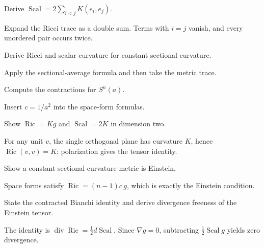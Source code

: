 \begin{problem}\label{prob:vii27-04}
Derive \(\operatorname{Scal}=2\sum_{i<j}K(e_i,e_j)\).
\end{problem}
\begin{solution}
Expand the Ricci trace as a double sum. Terms with \(i=j\) vanish, and every unordered pair occurs twice.
\end{solution}

\begin{problem}\label{prob:vii27-05}
Derive Ricci and scalar curvature for constant sectional curvature.
\end{problem}
\begin{solution}
Apply the sectional-average formula and then take the metric trace.
\end{solution}

\begin{problem}\label{prob:vii27-06}
Compute the contractions for \(S^n(a)\).
\end{problem}
\begin{solution}
Insert \(c=1/a^2\) into the space-form formulas.
\end{solution}

\begin{problem}\label{prob:vii27-07}
Show \(\operatorname{Ric}=Kg\) and \(\operatorname{Scal}=2K\) in dimension two.
\end{problem}
\begin{solution}
For any unit \(v\), the single orthogonal plane has curvature \(K\), hence \(\operatorname{Ric}(v,v)=K\); polarization gives the tensor identity.
\end{solution}

\begin{problem}\label{prob:vii27-08}
Show a constant-sectional-curvature metric is Einstein.
\end{problem}
\begin{solution}
Space forms satisfy \(\operatorname{Ric}=(n-1)c\,g\), which is exactly the Einstein condition.
\end{solution}

\begin{problem}\label{prob:vii27-09}
State the contracted Bianchi identity and derive divergence freeness of the Einstein tensor.
\end{problem}
\begin{solution}
The identity is \(\operatorname{div}\operatorname{Ric}=\frac12d\operatorname{Scal}\). Since \(\nabla g=0\), subtracting \(\frac12\operatorname{Scal}g\) yields zero divergence.
\end{solution}

